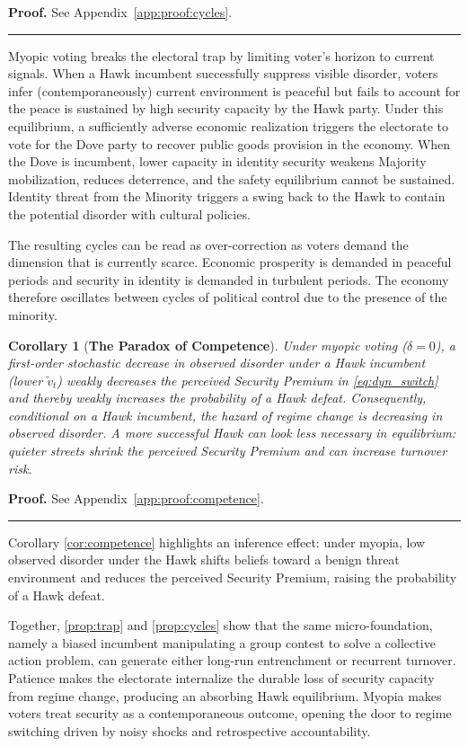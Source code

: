 \documentclass[11pt,twoside]{extarticle}
\newtheorem{corollary}{Corollary}
\newenvironment{proof}[1][Proof]{\noindent \textbf{#1.} }{\ \rule{0.5em}{0.5em}}
\begin{document}
\begin{proof}
See Appendix~\autoref{app:proof:cycles}.
\end{proof}

Myopic voting breaks the electoral trap by limiting voter's horizon to current signals. When a Hawk incumbent successfully suppress visible disorder, voters infer (contemporaneously) current environment is peaceful but fails to account for the peace is sustained by high security capacity by the Hawk party. Under this equilibrium, a sufficiently adverse economic realization triggers the electorate to vote for the Dove party to recover public goods provision in the economy. When the Dove is incumbent, lower capacity in identity security weakens Majority mobilization, reduces deterrence, and the safety equilibrium cannot be sustained. Identity threat from the Minority triggers a swing back to the Hawk to contain the potential disorder with cultural policies.

The resulting cycles can be read as over-correction as voters demand the dimension that is currently scarce. Economic prosperity is demanded in peaceful periods and security in identity is demanded in turbulent periods. The economy therefore oscillates between cycles of political control due to the presence of the minority.

\begin{corollary}[\textbf{The Paradox of Competence}] \label{cor:competence}
Under myopic voting ($\delta=0$), a first-order stochastic decrease in observed disorder under a Hawk incumbent (lower $\tilde{v}_t$) weakly decreases the perceived Security Premium in \autoref{eq:dyn_switch} and thereby weakly increases the probability of a Hawk defeat. Consequently, conditional on a Hawk incumbent, the hazard of regime change is decreasing in observed disorder.
A more successful Hawk can look less necessary in equilibrium: quieter streets shrink the perceived Security Premium and can increase turnover risk.
\end{corollary}

\begin{proof}
See Appendix~\autoref{app:proof:competence}.
\end{proof}

Corollary \autoref{cor:competence} highlights an inference effect: under myopia, low observed disorder under the Hawk shifts beliefs toward a benign threat environment and reduces the perceived Security Premium, raising the probability of a Hawk defeat.

Together, \autoref{prop:trap} and \autoref{prop:cycles} show that the same micro-foundation, namely a biased incumbent manipulating a group contest to solve a collective action problem, can generate either long-run entrenchment or recurrent turnover. Patience makes the electorate internalize the durable loss of security capacity from regime change, producing an absorbing Hawk equilibrium. Myopia makes voters treat security as a contemporaneous outcome, opening the door to regime switching driven by noisy shocks and retrospective accountability.
\end{document}
